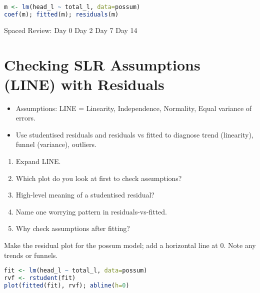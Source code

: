 \documentclass[11pt,a4paper]{article}
\def\textbf#1{#1}%
\newcommand{\reviewticks}{
  \vspace{0.4em}
  \noindent\scriptsize\textbf{Spaced Review:}
  \fbox{\phantom{D0}} Day 0\quad
  \fbox{\phantom{D2}} Day 2\quad
  \fbox{\phantom{D7}} Day 7\quad
  \fbox{\phantom{D14}} Day 14
}
\begin{document}
\begin{rbox}
\begin{lstlisting}[language=R]
m <- lm(head_l ~ total_l, data=possum)
coef(m); fitted(m); residuals(m)
\end{lstlisting}
\end{rbox}

\reviewticks

\section{Checking SLR Assumptions (LINE) with Residuals}

\begin{corebox}
\begin{itemize}
  \item Assumptions: \textbf{LINE} = Linearity, Independence, Normality, Equal variance of errors.
  \item Use \textbf{studentised residuals} and \textbf{residuals vs fitted} to diagnose trend (linearity), funnel (variance), outliers.
\end{itemize}
\end{corebox}

\begin{recallbox}
\begin{enumerate}
  \item Expand LINE.
  \item Which plot do you look at first to check assumptions?
  \item High-level meaning of a studentised residual?
  \item Name one worrying pattern in residuals-vs-fitted.
  \item Why check assumptions after fitting?
\end{enumerate}
\end{recallbox}

\begin{practicebox}
Make the residual plot for the possum model; add a horizontal line at 0. Note any trends or funnels.
\end{practicebox}

\begin{rbox}
\begin{lstlisting}[language=R]
fit <- lm(head_l ~ total_l, data=possum)
rvf <- rstudent(fit)
plot(fitted(fit), rvf); abline(h=0)
\end{lstlisting}
\end{rbox}
\end{document}
